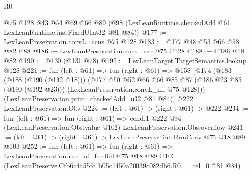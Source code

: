 \begin{lexlean}{R0}
\begin{coremodule}
    @75
    @128
    @43
    @54
    @69
    @66
    @89
    (@98 (LexLeanRuntime.checkedAdd @61 LexLeanRuntime.instFixedUInt32 @81 @84))
@177 := LexLeanPreservation.convL_cons @75 @128
@183 := @177 @48 @53 @66 @68 @82 @88
@186 := LexLeanPreservation.conv_var @75 @128
@188 := @186 @18 @82
@190 := @130 (@131 @78)
@192 := LexLeanTarget.TargetSemantics.lookup @128
@221 := fun (left : @61) =>
  fun (right : @61) =>
  @158
    (@174
      (@183
        (@188 (@190 (@192 @18)))
        (@177
          @50
          @52
          @66
          @66
          @85
          @87
          (@186 @23 @85 (@190 (@192 @23)))
          (LexLeanPreservation.convL_nil @75 @128)))
      (LexLeanPreservation.prim_checkedAdd_u32 @81 @84))
@222 := LexLeanPreservation.Obs
@224 := (left : @61) -> (right : @61) -> @222
@234 := fun (left : @61) =>
  fun (right : @61) =>
  cond.{1} @222 @94 (LexLeanPreservation.Obs.value @102) LexLeanPreservation.Obs.overflow
@241 := (left : @61) -> (right : @61) -> LexLeanPreservation.RunConv @75 @18 @89 @103
@252 := fun (left : @61) =>
  fun (right : @61) =>
  LexLeanPreservation.run_of_funRel
    @75
    @18
    @89
    @103
    (LexLeanPreserve.Cfb6c4a55fc1b05c1450a20039c082db6.R0.__rel_0 @81 @84)
\end{coremodule}
\end{lexlean}
